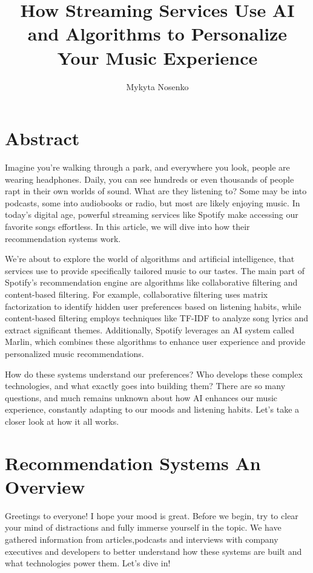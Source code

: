 \documentclass[12pt,a4paper]{article}
\title{How Streaming Services Use AI and Algorithms to Personalize Your Music Experience}
\author{Mykyta Nosenko}
\begin{document}
\maketitle
\section*{Abstract}

Imagine you’re walking through a park, and everywhere you look, people are wearing headphones. Daily, you can see hundreds or even thousands of people rapt in their own worlds of sound. What are they listening to? Some may be into podcasts, some into audiobooks or radio, but most are likely enjoying music. In today’s digital age, powerful streaming services like Spotify make accessing our favorite songs effortless. In this article, we will dive into how their recommendation systems work.

We’re about to explore the world of algorithms and artificial intelligence, that services use to provide specifically tailored music to our tastes. The main part of Spotify’s recommendation engine are algorithms like collaborative filtering and content-based filtering. For example, collaborative filtering uses matrix factorization to identify hidden user preferences based on listening habits, while content-based filtering employs techniques like TF-IDF to analyze song lyrics and extract significant themes. Additionally, Spotify leverages an AI system called Marlin, which combines these algorithms to enhance user experience and provide personalized music recommendations\citep{href}.

How do these systems understand our preferences? Who develops these complex technologies, and what exactly goes into building them? There are so many questions, and much remains unknown about how AI enhances our music experience, constantly adapting to our moods and listening habits. Let's take a closer look at how it all works.

\newpage
\tableofcontents
\newpage

\section{Recommendation Systems An Overview}

Greetings to everyone! I hope your mood is great. Before we begin, try to clear your mind of distractions and fully immerse yourself in the topic. We have gathered information from articles,podcasts and interviews with company executives and developers to better understand how these systems are built and what technologies power them.  Let's dive in!
\end{document}
